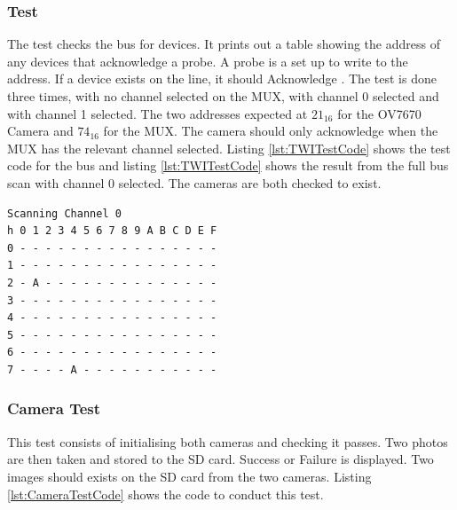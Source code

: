 

\subsubsection{\itc Test}
The \itc test checks the bus for devices. It prints out a table showing the address of any devices that acknowledge a probe. A probe is a set up to write to the address. If a device exists on the line, it should Acknowledge \citep{Philips:I2C}. The test is done three times, with no channel selected on the \itc MUX, with channel 0 selected and with channel 1 selected. The two addresses expected at $21_{16}$ for the OV7670 Camera and $74_{16}$ for the \itc MUX. The camera should only acknowledge when the \itc MUX has the relevant channel selected. Listing \ref{lst:TWITestCode} shows the test code for the \itc bus and listing \ref{lst:TWITestCode} shows the result from the full bus scan with channel 0 selected. The cameras are both checked to exist.


\begin{lstlisting}[caption={Result of \itc bus scan with Channel 0 of the \itc MUX selected},label={lst:I2CTest}]
Scanning Channel 0
h 0 1 2 3 4 5 6 7 8 9 A B C D E F
0 - - - - - - - - - - - - - - - -
1 - - - - - - - - - - - - - - - -
2 - A - - - - - - - - - - - - - -
3 - - - - - - - - - - - - - - - -
4 - - - - - - - - - - - - - - - -
5 - - - - - - - - - - - - - - - -
6 - - - - - - - - - - - - - - - -
7 - - - - A - - - - - - - - - - -
\end{lstlisting}

\subsubsection{Camera Test}

This test consists of initialising both cameras and checking it passes. Two photos are then taken and stored to the SD card. Success or Failure is displayed. Two images should exists on the SD card from the two cameras. Listing \ref{lst:CameraTestCode} shows the code to conduct this test.


